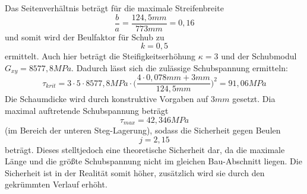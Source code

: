 \noindent Das Seitenverhältnis beträgt für die maximale Streifenbreite
\begin{equation}
	\frac{b}{a}=\frac{124,5 mm}{773 mm}=0,16
\end{equation}
und somit wird der Beulfaktor für Schub zu 
\begin{equation}
	k=0,5
\end{equation} ermittelt. Auch hier beträgt die Steifigkeitserhöhung $\kappa=3$ und der Schubmodul $G_{xy}=8577,8 MPa$. Dadurch lässt sich die zulässige Schubspannung ermitteln:
\begin{equation}
	\tau_{krit}=3\cdot 5\cdot 8577,8 MPa\cdot\biggl(\frac{4\cdot 0,078mm + 3mm}{124,5 mm}\biggr)^{2} =91,06 MPa
\end{equation}
Die Schaumdicke wird durch konstruktive Vorgaben auf $3 mm$ gesetzt. Dia maximal auftretende Schubspannung beträgt
\begin{equation}
	\tau_{max}=42,346 MPa
\end{equation}
(im Bereich der unteren Steg-Lagerung), sodass die Sicherheit gegen Beulen 
\begin{equation}
	j=2,15
\end{equation}
beträgt. Dieses stelltjedoch eine theoretische Sicherheit dar, da die maximale Länge und die größte Schubspannung nicht im gleichen Bau-Abschnitt liegen. Die Sicherheit ist in der Realität somit höher, zusätzlich wird sie durch den gekrümmten Verlauf erhöht.